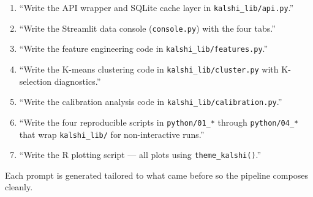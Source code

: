 \documentclass[11pt]{article}
\begin{document}
\begin{enumerate}[leftmargin=*, itemsep=0pt]
    \item ``Write the API wrapper and SQLite cache layer in \texttt{kalshi\_lib/api.py}.''
    \item ``Write the Streamlit data console (\texttt{console.py}) with the four tabs.''
    \item ``Write the feature engineering code in \texttt{kalshi\_lib/features.py}.''
    \item ``Write the K-means clustering code in \texttt{kalshi\_lib/cluster.py} with K-selection diagnostics.''
    \item ``Write the calibration analysis code in \texttt{kalshi\_lib/calibration.py}.''
    \item ``Write the four reproducible scripts in \texttt{python/01\_*} through \texttt{python/04\_*} that wrap \texttt{kalshi\_lib/} for non-interactive runs.''
    \item ``Write the R plotting script --- all plots using \texttt{theme\_kalshi()}.''
\end{enumerate}

Each prompt is generated tailored to what came before so the pipeline composes cleanly.
\end{document}
